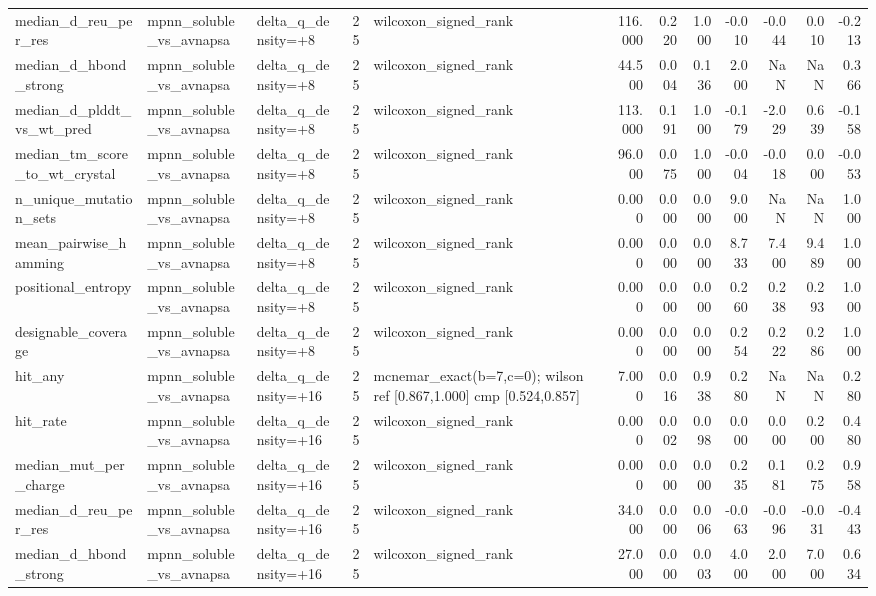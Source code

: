 \begin{table}
{\begin{tabular}{lllrlrrrrrrr}
median\_d\_reu\_per\_res & mpnn\_soluble\_vs\_avnapsa & delta\_q\_density=+8 & 25 & wilcoxon\_signed\_rank & 116.000 & 0.220 & 1.000 & -0.010 & -0.044 & 0.010 & -0.213 \\
median\_d\_hbond\_strong & mpnn\_soluble\_vs\_avnapsa & delta\_q\_density=+8 & 25 & wilcoxon\_signed\_rank & 44.500 & 0.004 & 0.136 & 2.000 & NaN & NaN & 0.366 \\
median\_d\_plddt\_vs\_wt\_pred & mpnn\_soluble\_vs\_avnapsa & delta\_q\_density=+8 & 25 & wilcoxon\_signed\_rank & 113.000 & 0.191 & 1.000 & -0.179 & -2.029 & 0.639 & -0.158 \\
median\_tm\_score\_to\_wt\_crystal & mpnn\_soluble\_vs\_avnapsa & delta\_q\_density=+8 & 25 & wilcoxon\_signed\_rank & 96.000 & 0.075 & 1.000 & -0.004 & -0.018 & 0.000 & -0.053 \\
n\_unique\_mutation\_sets & mpnn\_soluble\_vs\_avnapsa & delta\_q\_density=+8 & 25 & wilcoxon\_signed\_rank & 0.000 & 0.000 & 0.000 & 9.000 & NaN & NaN & 1.000 \\
mean\_pairwise\_hamming & mpnn\_soluble\_vs\_avnapsa & delta\_q\_density=+8 & 25 & wilcoxon\_signed\_rank & 0.000 & 0.000 & 0.000 & 8.733 & 7.400 & 9.489 & 1.000 \\
positional\_entropy & mpnn\_soluble\_vs\_avnapsa & delta\_q\_density=+8 & 25 & wilcoxon\_signed\_rank & 0.000 & 0.000 & 0.000 & 0.260 & 0.238 & 0.293 & 1.000 \\
designable\_coverage & mpnn\_soluble\_vs\_avnapsa & delta\_q\_density=+8 & 25 & wilcoxon\_signed\_rank & 0.000 & 0.000 & 0.000 & 0.254 & 0.222 & 0.286 & 1.000 \\
hit\_any & mpnn\_soluble\_vs\_avnapsa & delta\_q\_density=+16 & 25 & mcnemar\_exact(b=7,c=0); wilson ref [0.867,1.000] cmp [0.524,0.857] & 7.000 & 0.016 & 0.938 & 0.280 & NaN & NaN & 0.280 \\
hit\_rate & mpnn\_soluble\_vs\_avnapsa & delta\_q\_density=+16 & 25 & wilcoxon\_signed\_rank & 0.000 & 0.002 & 0.098 & 0.000 & 0.000 & 0.200 & 0.480 \\
median\_mut\_per\_charge & mpnn\_soluble\_vs\_avnapsa & delta\_q\_density=+16 & 25 & wilcoxon\_signed\_rank & 0.000 & 0.000 & 0.000 & 0.235 & 0.181 & 0.275 & 0.958 \\
median\_d\_reu\_per\_res & mpnn\_soluble\_vs\_avnapsa & delta\_q\_density=+16 & 25 & wilcoxon\_signed\_rank & 34.000 & 0.000 & 0.006 & -0.063 & -0.096 & -0.031 & -0.443 \\
median\_d\_hbond\_strong & mpnn\_soluble\_vs\_avnapsa & delta\_q\_density=+16 & 25 & wilcoxon\_signed\_rank & 27.000 & 0.000 & 0.003 & 4.000 & 2.000 & 7.000 & 0.634 \\

\end{tabular}}
\end{table}
